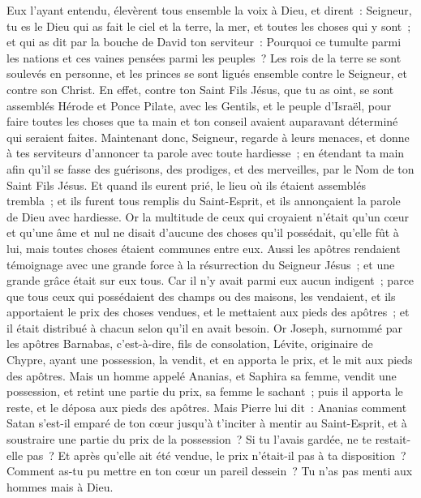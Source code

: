 \begin{multicols}{2}
Eux l'ayant entendu, élevèrent tous ensemble la voix à Dieu, et dirent~: Seigneur, tu es le Dieu qui as fait le ciel et la terre, la mer, et toutes les choses qui y sont~;
et qui as dit par la bouche de David ton serviteur~: Pourquoi ce tumulte parmi les nations et ces vaines pensées parmi les peuples~?
Les rois de la terre se sont soulevés en personne, et les princes se sont ligués ensemble contre le Seigneur, et contre son Christ.
En effet, contre ton Saint Fils Jésus, que tu as oint, se sont assemblés Hérode et Ponce Pilate, avec les Gentils, et le peuple d'Israël,
pour faire toutes les choses que ta main et ton conseil avaient auparavant déterminé qui seraient faites. 
Maintenant donc, Seigneur, regarde à leurs menaces, et donne à tes serviteurs d'annoncer ta parole avec toute hardiesse~;
en étendant ta main afin qu'il se fasse des guérisons, des prodiges, et des merveilles, par le Nom de ton Saint Fils Jésus.
Et quand ils eurent prié, le lieu où ils étaient assemblés trembla~; et ils furent tous remplis du Saint-Esprit, et ils annonçaient la parole de Dieu avec hardiesse.
Or la multitude de ceux qui croyaient n'était qu'un cœur et qu'une âme et nul ne disait d'aucune des choses qu'il possédait, qu'elle fût à lui, mais toutes choses étaient communes entre eux.
Aussi les apôtres rendaient témoignage avec une grande force à la résurrection du Seigneur Jésus~; et une grande grâce était sur eux tous.
Car il n'y avait parmi eux aucun indigent~; parce que tous ceux qui possédaient des champs ou des maisons, les vendaient, et ils apportaient le prix des choses vendues,
et le mettaient aux pieds des apôtres~; et il était distribué à chacun selon qu'il en avait besoin.
Or Joseph, surnommé par les apôtres Barnabas, c'est-à-dire, fils de consolation, Lévite, originaire de Chypre,
ayant une possession, la vendit, et en apporta le prix, et le mit aux pieds des apôtres.
\VerseOne{}Mais un homme appelé Ananias, et Saphira sa femme, vendit une possession,
et retint une partie du prix, sa femme le sachant~; puis il apporta le reste, et le déposa aux pieds des apôtres.
Mais Pierre lui dit~: Ananias comment Satan s'est-il emparé de ton cœur jusqu'à t'inciter à mentir au Saint-Esprit, et à soustraire une partie du prix de la possession~?
Si tu l'avais gardée, ne te restait-elle pas~? Et après qu'elle ait été vendue, le prix n'était-il pas à ta disposition~? Comment as-tu pu mettre en ton cœur un pareil dessein~? Tu n'as pas menti aux hommes mais à Dieu.

\end{multicols}
